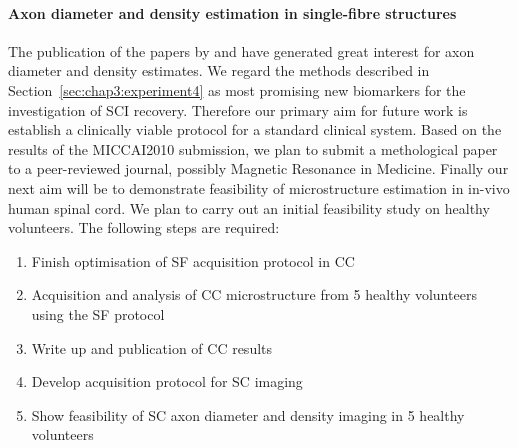 \paragraph*{Axon diameter and density estimation in single-fibre structures}
The publication of the papers by \cite{Barazany:2009} and \cite{Alexander:2010} have generated great interest for axon diameter and density estimates. We regard the methods described in Section~\ref{sec:chap3:experiment4} as most promising new biomarkers for the investigation of \gls{SCI} recovery. Therefore our primary aim for future work is establish a clinically viable protocol for a standard clinical system. Based on the results of the MICCAI2010 submission, we plan to submit a methological paper to a peer-reviewed journal, possibly Magnetic Resonance in Medicine. Finally our next aim will be to demonstrate feasibility of microstructure estimation in in-vivo human spinal cord. We plan to carry out an initial feasibility study on healthy volunteers. The following steps are required:
\begin{enumerate}
  \item Finish optimisation of \gls{SF} acquisition protocol in \gls{CC}
  \item Acquisition and analysis of \gls{CC} microstructure from 5 healthy volunteers using the \gls{SF} protocol
  \item Write up and publication of \gls{CC} results
  \item Develop acquisition protocol for \gls{SC} imaging
  \item Show feasibility of \gls{SC} axon diameter and density imaging in 5 healthy volunteers
\end{enumerate}
